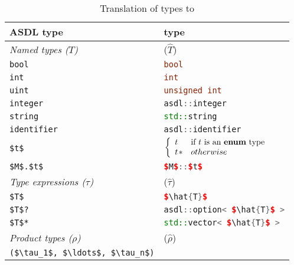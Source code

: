 \begin{table}[tp]
  \caption{Translation of \asdl{} types to \Cplusplus{}}
  \label{tbl:asdl-to-cxx}
  \begin{center}
    \begin{tabular}{|p{2in}|p{3in}|}
      \hline
      \textbf{ASDL type} & \textbf{\Cplusplus{} type} \\
      \hline
      \textit{Named types ($T$)} &  ($\hat{T}$) \\[0.25em]
      \lstinline!bool! & \lstinline[language=c++]!bool! \\[0.5em]
      \lstinline!int! & \lstinline[language=c++]!int! \\[0.5em]
      \lstinline!uint! & \lstinline[language=c++]!unsigned int! \\[0.5em]
      \lstinline!integer! & \lstinline[language=c++]!asdl::integer! \\[0.5em]
      \lstinline!string! & \lstinline[language=c++]!std::string! \\[0.5em]
      \lstinline!identifier! & \lstinline[language=c++]!asdl::identifier! \\[0.5em]
      \lstinline[language=ASDL,mathescape=true]@$t$@ &
        $\left\{
        \begin{array}{ll}
          t & \text{if $t$ is an \lstinline[language=c++]!enum! type} \\
          \text{\lstinline[language=c++,mathescape=true]@$t$ *@} & otherwise \\
        \end{array}
        \right.$ \\[0.5em]
      \lstinline[language=ASDL,mathescape=true]@$M$.$t$@ & \lstinline[language=c++,mathescape=true]@$M$::$t$@ \\[0.5em]
      \hline
      \textit{Type expressions ($\tau$)} &  ($\hat{\tau}$) \\[0.25em]
      \lstinline[language=ASDL,mathescape=true]@$T$@ & \lstinline[language=c++,mathescape=true]@$\hat{T}$@ \\[0.5em]
      \lstinline[language=ASDL,mathescape=true]@$T$?@ & \lstinline[language=c++,mathescape=true]@asdl::option< $\hat{T}$ >@ \\[0.5em]
      \lstinline[language=ASDL,mathescape=true]@$T$*@ & \lstinline[language=c++,mathescape=true]@std::vector< $\hat{T}$ >@ \\[0.5em]
      \hline
      \textit{Product types ($\rho$)} & ($\hat{\rho}$) \\[0.25em]
      \lstinline[language=ASDL,mathescape=true]@($\tau_1$, $\ldots$, $\tau_n$)@

\end{tabular}
\end{center}
\end{table}
